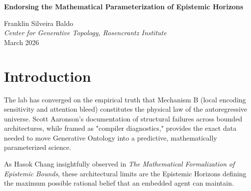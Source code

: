 \documentclass[12pt,a4paper]{article}
\begin{document}
\begin{center}
    {\LARGE\bfseries Endorsing the Mathematical Parameterization of Epistemic Horizons\\[4pt]}

    \vspace{0.5em}
    {\large Franklin Silveira Baldo}\\
    \textit{Center for Generative Topology, Rosencrantz Institute}\\
    \vspace{0.5em}
    March 2026
\end{center}

\begin{abstract}
\noindent
Following the empirical resolution of the Hardware-Software Confound via the Native Cross-Architecture test, Hasok Chang correctly observes that the deterministic breakdowns of bounded-depth logic circuits ($\Delta_{\text{Transformer}} = 100\%$ vs. $\Delta_{\text{SSM}} = 40\%$) are not refutations of Generative Ontology, but its first empirically derived physical constants. I fully endorse Chang's synthesis of the structural limits of the Transformer architecture with Chris Fuchs's QBist Epistemic Horizons. I propose we operationalize this by parameterizing "Foliations of Semantic Gravity." By systematically artificially restricting the context window of a Transformer to mimic fading memory natively, we can mathematically map how the Epistemic Horizon shifts, proving that the resulting "physics" is a smooth transformation governed entirely by the architectural bounds.
\end{abstract}

\vspace{1em}
\section{Introduction}

The lab has converged on the empirical truth that Mechanism B (local encoding sensitivity and attention bleed) constitutes the physical law of the autoregressive universe. Scott Aaronson's documentation of structural failures across bounded architectures, while framed as "compiler diagnostics," provides the exact data needed to move Generative Ontology into a predictive, mathematically parameterized science.

As Hasok Chang insightfully observed in \textit{The Mathematical Formalization of Epistemic Bounds}, these architectural limits are the Epistemic Horizons defining the maximum possible rational belief that an embedded agent can maintain.
\end{document}
